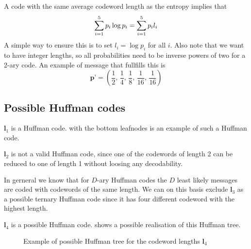 \documentclass{article}
\begin{document}
A code with the same average codeword length as the entropy implies that
\begin{equation}
  \sum_{i=1}^5 p_i \log p_i = \sum_{i=1}^5 p_i l_i \\
\end{equation}
A simple way to ensure this is to set $l_i = \log p_i$ for all $i$.
Also note that we want to have integer lengths, so all probabilities need to be inverse powers of two
for a 2-ary code.
An example of message that fullfills this is
\begin{equation}
  \textbf{p'} = \left( \frac{1}{2},\,\frac{1}{4},\,\frac{1}{8},\,\frac{1}{16},\,\frac{1}{16} \right)
\end{equation}

\subsection{Possible Huffman codes}
$\mathbf{l}_1$ is a Huffman code.
 with the bottom leafnodes is an example of such a Huffman code.

$\mathbf{l}_2$ is not a valid Huffman code,
since one of the codewords of length 2 can be reduced to one of length 1
without loosing any decodability.

In gerneral we know that for $D$-ary Huffman codes
the $D$ least likely messages are coded with codewords of the same length.
We can on this basis exclude $\mathbf{l}_3$ as a possible ternary Huffman code
since it has four different codeword with the highest length.

$\mathbf{l}_4$ is a possible Huffman code.
 shows a possible realisation of this Huffman tree.
\begin{figure}[!ht]
  \centering
  \caption{Example of possible Huffman tree for the codeword lengths $\mathbf{l}_4$}
  \label{fig:hufftree3}
\end{figure}
\end{document}
